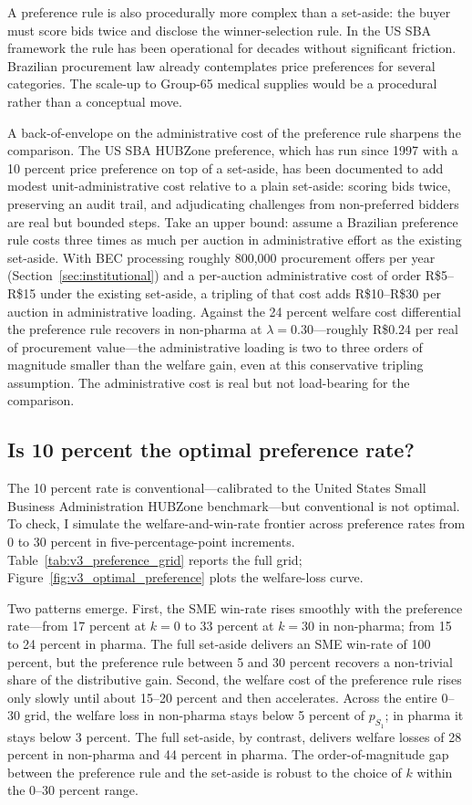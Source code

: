 A preference rule is also procedurally more complex than a set-aside: the buyer must score bids twice and disclose the winner-selection rule. In the US SBA framework the rule has been operational for decades without significant friction. Brazilian procurement law already contemplates price preferences for several categories. The scale-up to Group-65 medical supplies would be a procedural rather than a conceptual move.

A back-of-envelope on the administrative cost of the preference rule sharpens the comparison. The US SBA HUBZone preference, which has run since 1997 with a 10 percent price preference on top of a set-aside, has been documented to add modest unit-administrative cost relative to a plain set-aside: scoring bids twice, preserving an audit trail, and adjudicating challenges from non-preferred bidders are real but bounded steps. Take an upper bound: assume a Brazilian preference rule costs three times as much per auction in administrative effort as the existing set-aside. With BEC processing roughly 800{,}000 procurement offers per year (Section~\ref{sec:institutional}) and a per-auction administrative cost of order R\$5--R\$15 under the existing set-aside, a tripling of that cost adds R\$10--R\$30 per auction in administrative loading. Against the 24 percent welfare cost differential the preference rule recovers in non-pharma at $\lambda = 0.30$---roughly R\$0.24 per real of procurement value---the administrative loading is two to three orders of magnitude smaller than the welfare gain, even at this conservative tripling assumption. The administrative cost is real but not load-bearing for the comparison.

\subsection{Is 10 percent the optimal preference rate?}\label{sec:optimal_preference}

The 10 percent rate is conventional---calibrated to the United States Small Business Administration HUBZone benchmark---but conventional is not optimal. To check, I simulate the welfare-and-win-rate frontier across preference rates from 0 to 30 percent in five-percentage-point increments. Table~\ref{tab:v3_preference_grid} reports the full grid; Figure~\ref{fig:v3_optimal_preference} plots the welfare-loss curve.

Two patterns emerge. First, the SME win-rate rises smoothly with the preference rate---from 17 percent at $k=0$ to 33 percent at $k=30$ in non-pharma; from 15 to 24 percent in pharma. The full set-aside delivers an SME win-rate of 100 percent, but the preference rule between 5 and 30 percent recovers a non-trivial share of the distributive gain. Second, the welfare cost of the preference rule rises only slowly until about 15--20 percent and then accelerates. Across the entire 0--30 grid, the welfare loss in non-pharma stays below 5 percent of $p_{S_1}$; in pharma it stays below 3 percent. The full set-aside, by contrast, delivers welfare losses of 28 percent in non-pharma and 44 percent in pharma. The order-of-magnitude gap between the preference rule and the set-aside is robust to the choice of $k$ within the 0--30 percent range.


